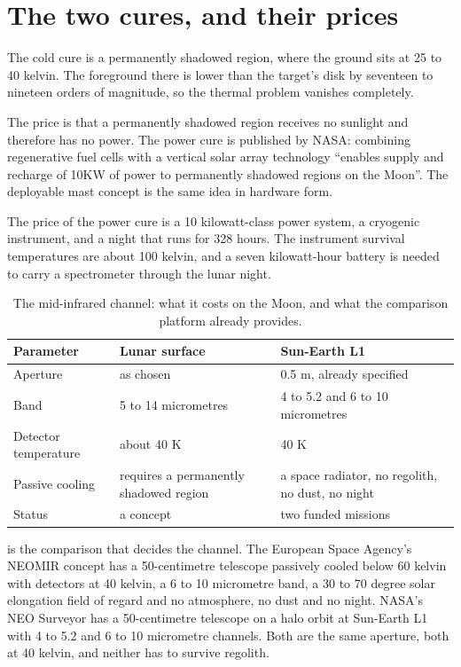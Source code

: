 \section{The two cures, and their prices}

The cold cure is a permanently shadowed region, where the ground sits at 25
to 40 kelvin. The foreground there is lower than the target's disk by
seventeen to nineteen orders of magnitude, so the thermal problem vanishes
completely.

The price is that a permanently shadowed region receives no sunlight and
therefore has no power. The power cure is published by NASA: combining
regenerative fuel cells with a vertical solar array technology ``enables
supply and recharge of 10KW of power to permanently shadowed regions on the
Moon''. The deployable mast concept is the same idea in hardware form.

The price of the power cure is a 10 kilowatt-class power system, a cryogenic
instrument, and a night that runs for 328 hours. The instrument survival
temperatures are about 100 kelvin, and a seven kilowatt-hour battery is
needed to carry a spectrometer through the lunar night.

\begin{table}[!htbp]
\centering
\small
\caption{The mid-infrared channel: what it costs on the Moon, and what the
comparison platform already provides.}
\label{tab:mir-comparison}
\begin{tabularx}{\textwidth}{@{}P{1.24in}P{1.32in}Y@{}}
\toprule
{}
\textbf{Parameter} & \textbf{Lunar surface} & \textbf{Sun-Earth L1} \\
\midrule
Aperture & as chosen & 0.5 m, already specified \\
Band & 5 to 14 micrometres & 4 to 5.2 and 6 to 10 micrometres \\
Detector temperature & about 40 K & 40 K \\
Passive cooling & requires a permanently shadowed region & a space
radiator, no regolith, no dust, no night \\
Status & a concept & two funded missions \\
\bottomrule
\end{tabularx}
\end{table}

 is the comparison that decides the channel. The
European Space Agency's NEOMIR concept has a 50-centimetre telescope
passively cooled below 60 kelvin with detectors at 40 kelvin, a 6 to 10
micrometre band, a 30 to 70 degree solar elongation field of regard and no
atmosphere, no dust and no night. NASA's NEO Surveyor has a 50-centimetre
telescope on a halo orbit at Sun-Earth L1 with 4 to 5.2 and 6 to 10
micrometre channels. Both are the same aperture, both at 40 kelvin, and
neither has to survive regolith.

